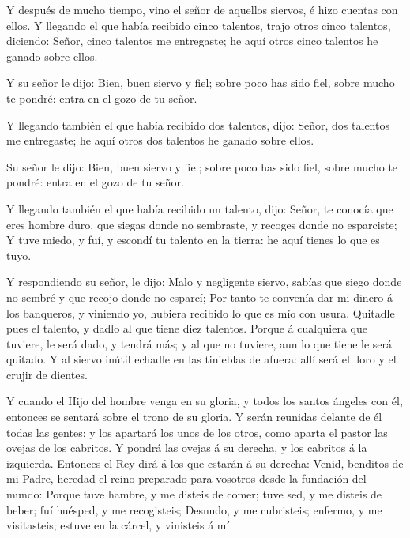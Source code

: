  Y después de mucho tiempo, vino el señor de aquellos
siervos, é hizo cuentas con ellos.  Y llegando el que había
recibido cinco talentos, trajo otros cinco talentos, diciendo: Señor,
cinco talentos me entregaste; he aquí otros cinco talentos he ganado
sobre ellos.

 Y su señor le dijo: Bien, buen siervo y fiel; sobre poco
has sido fiel, sobre mucho te pondré: entra en el gozo de tu señor.

 Y llegando también el que había recibido dos talentos,
dijo: Señor, dos talentos me entregaste; he aquí otros dos talentos he
ganado sobre ellos.

 Su señor le dijo: Bien, buen siervo y fiel; sobre poco has
sido fiel, sobre mucho te pondré: entra en el gozo de tu señor.

 Y llegando también el que había recibido un talento, dijo:
Señor, te conocía que eres hombre duro, que siegas donde no sembraste, y
recoges donde no esparciste;  Y tuve miedo, y fuí, y
escondí tu talento en la tierra: he aquí tienes lo que es tuyo.

 Y respondiendo su señor, le dijo: Malo y negligente
siervo, sabías que siego donde no sembré y que recojo donde no esparcí;
 Por tanto te convenía dar mi dinero á los banqueros, y
viniendo yo, hubiera recibido lo que es mío con usura. 
Quitadle pues el talento, y dadlo al que tiene diez talentos.
 Porque á cualquiera que tuviere, le será dado, y tendrá
más; y al que no tuviere, aun lo que tiene le será quitado.
 Y al siervo inútil echadle en las tinieblas de afuera:
allí será el lloro y el crujir de dientes.

 Y cuando el Hijo del hombre venga en su gloria, y todos
los santos ángeles con él, entonces se sentará sobre el trono de su
gloria.  Y serán reunidas delante de él todas las gentes: y
los apartará los unos de los otros, como aparta el pastor las ovejas de
los cabritos.  Y pondrá las ovejas á su derecha, y los
cabritos á la izquierda.  Entonces el Rey dirá á los que
estarán á su derecha: Venid, benditos de mi Padre, heredad el reino
preparado para vosotros desde la fundación del mundo: 
Porque tuve hambre, y me disteis de comer; tuve sed, y me disteis de
beber; fuí huésped, y me recogisteis;  Desnudo, y me
cubristeis; enfermo, y me visitasteis; estuve en la cárcel, y vinisteis
á mí.

